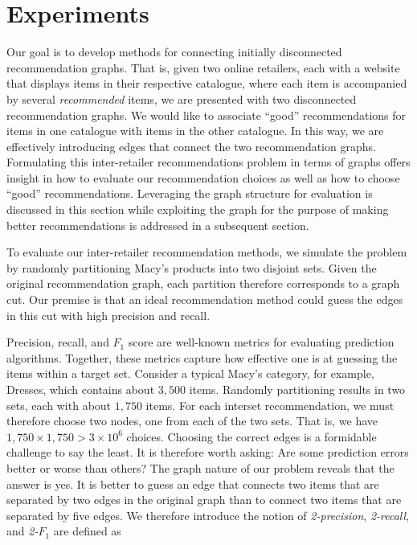 \documentclass[11pt]{article}
\begin{document}
\section*{Experiments}
Our goal is to develop methods for connecting initially disconnected
recommendation graphs. That is, given two online retailers, each with a website
that displays items in their respective catalogue, where each item is
accompanied by several {\em recommended} items, we are presented with two
disconnected recommendation graphs. We would like to associate ``good''
recommendations for items in one catalogue with items in the other catalogue. In
this way, we are effectively introducing edges that connect the two
recommendation graphs. Formulating this inter-retailer recommendations problem
in terms of graphs offers insight in how to evaluate our recommendation choices
as well as how to choose ``good'' recommendations. Leveraging the graph
structure for evaluation is discussed in this section while exploiting the graph
for the purpose of making better recommendations is addressed in a subsequent
section.

To evaluate our inter-retailer recommendation methods, we simulate the problem
by randomly partitioning Macy's products into two disjoint sets. Given the
original recommendation graph, each partition therefore corresponds to a graph
cut. Our premise is that an ideal recommendation method could guess the edges in
this cut with high precision and recall.

Precision, recall, and $F_1$ score are well-known metrics for evaluating
prediction algorithms.  Together, these metrics capture how effective one is at
guessing the items within a target set. Consider a typical Macy's category, for
example, Dresses, which contains about $3,500$ items. Randomly partitioning
results in two sets, each with about $1,750$ items. For each interset
recommendation, we must therefore choose two nodes, one from each of the two
sets. That is, we have $1,750 \times 1,750 > 3 \times 10^6$ choices. Choosing
the correct edges is a formidable challenge to say the least. It is therefore
worth asking: Are some prediction errors better or worse than others? The graph
nature of our problem reveals that the answer is yes. It is better to guess an
edge that connects two items that are separated by two edges in the original
graph than to connect two items that are separated by five edges. We therefore
introduce the notion of {\em 2-precision}, {\em 2-recall}, and {\em 2-}$F_1$ are
defined as
\end{document}
